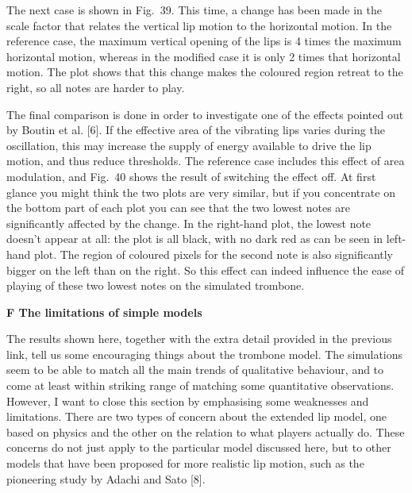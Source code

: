 

  The next case is shown in Fig.\ 39. This time, a change has been made in the 
  scale factor that relates the vertical lip motion to the horizontal motion. 
  In the reference case, the maximum vertical opening of the lips is 4 times 
  the maximum horizontal motion, whereas in the modified case it is only 2 
  times that horizontal motion. The plot shows that this change makes the 
  coloured region retreat to the right, so all notes are harder to play. 



  The final comparison is done in order to investigate one of the effects 
  pointed out by Boutin et al. [6]. If the effective area of the vibrating lips 
  varies during the oscillation, this may increase the supply of energy 
  available to drive the lip motion, and thus reduce thresholds. The reference 
  case includes this effect of area modulation, and Fig.\ 40 shows the result 
  of switching the effect off. At first glance you might think the two plots 
  are very similar, but if you concentrate on the bottom part of each plot you 
  can see that the two lowest notes are significantly affected by the change. 
  In the right-hand plot, the lowest note doesn’t appear at all: the plot is 
  all black, with no dark red as can be seen in left-hand plot. The region of 
  coloured pixels for the second note is also significantly bigger on the left 
  than on the right. So this effect can indeed influence the ease of playing of 
  these two lowest notes on the simulated trombone. 



  \textbf{F The limitations of simple models} 

  The results shown here, together with the extra detail provided in the 
  previous link, tell us some encouraging things about the trombone model. The 
  simulations seem to be able to match all the main trends of qualitative 
  behaviour, and to come at least within striking range of matching some 
  quantitative observations. However, I want to close this section by 
  emphasising some weaknesses and limitations. There are two types of concern 
  about the extended lip model, one based on physics and the other on the 
  relation to what players actually do. These concerns do not just apply to the 
  particular model discussed here, but to other models that have been proposed 
  for more realistic lip motion, such as the pioneering study by Adachi and 
  Sato [8]. 

